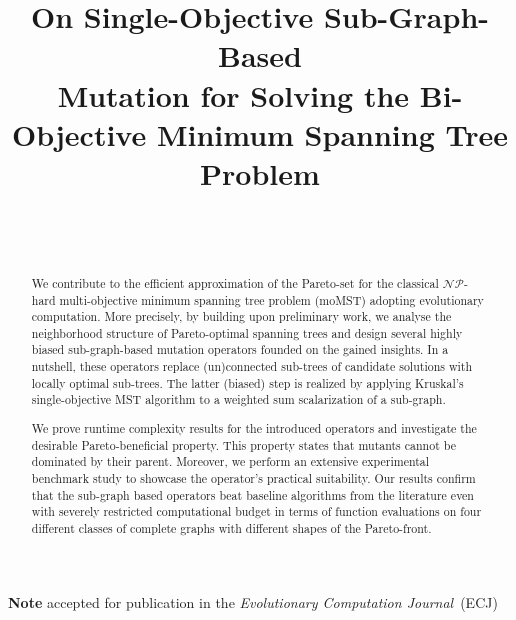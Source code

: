\documentclass[twoside]{article}
\begin{document}
\title{\bf On Single-Objective Sub-Graph-Based\\ Mutation for Solving the Bi-Objective Minimum Spanning Tree Problem}

\author{
         \hfill {}\\ 
\AND
        \hfill {}\\ 
}

\maketitle

{
\parindent0pt
\textbf{Note} accepted for publication in the \emph{Evolutionary Computation Journal}~(ECJ)
}
\medskip

\begin{abstract}
We contribute to the efficient approximation of the Pareto-set for the classical $\mathcal{NP}$-hard multi-objective minimum spanning tree problem (moMST) adopting evolutionary computation. More precisely, by building upon preliminary work, we analyse the neighborhood structure of Pareto-optimal spanning trees and design several highly biased sub-graph-based mutation operators founded on the gained insights. In a nutshell, these operators replace (un)connected sub-trees of candidate solutions with locally optimal sub-trees. The latter (biased) step is realized by applying Kruskal's single-objective MST algorithm to a weighted sum scalarization of a sub-graph.

We prove runtime complexity results for the introduced operators and investigate the desirable Pareto-beneficial property. This property states that mutants cannot be dominated by their parent. Moreover, we perform an extensive experimental benchmark study to showcase the operator's practical suitability. Our results confirm that the sub-graph based operators beat baseline algorithms from the literature even with severely restricted computational budget in terms of function evaluations on four different classes of complete graphs with different shapes of the Pareto-front.
\end{abstract}
\end{document}
